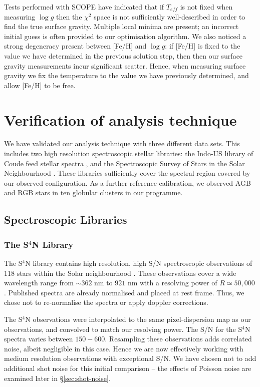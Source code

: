 \documentclass{emulateapj}
\begin{document}
Tests performed with SCOPE have indicated that if $T_{eff}$ is not fixed when measuring $\log{g}$ then the $\chi^2$ space is not sufficiently well-described in order to find the true surface gravity. Multiple local minima are present; an incorrect initial guess is often provided to our optimisation algorithm. We also noticed a strong degeneracy present between [Fe/H] and $\log{g}$: if [Fe/H] is fixed to the value we have determined in the previous solution step, then then our surface gravity measurements incur significant scatter. Hence, when measuring surface gravity we fix the temperature to the value we have previously determined, and allow [Fe/H] to be free.

\section{Verification of analysis technique}
\label{sec:calibration}

We have validated our analysis technique with three different data sets. This includes two high resolution spectroscopic stellar libraries: the Indo-US library of Coude feed stellar spectra \citep[][hereafter CFLIB]{Valdes;et-al_2004}, and the Spectroscopic Survey of Stars in the Solar Neighbourhood \citep[][hereafter S$^{4}$N]{Allende_Prieto;et-al_2004}. These libraries sufficiently cover the spectral region covered by our observed configuration. As a further reference calibration, we observed AGB and RGB stars in ten globular clusters in our programme.

\subsection{Spectroscopic Libraries}

\label{sec:S4N}
\subsubsection{The S$^4$N Library}
The S${^4}$N library contains high resolution, high S/N spectroscopic observations of 118 stars within the Solar neighbourhood \citep{Allende-Prieto;et-al_2004}. These observations cover a wide wavelength range from $\sim362$ nm to $921$ nm with a resolving power of $R\simeq50,000$. Published spectra are already normalised and placed at rest frame. Thus, we chose not to re-normalise the spectra or apply doppler corrections.

The S$^4$N observations were interpolated to the same pixel-dispersion map as our observations, and convolved to match our resolving power. The S/N for the S$^4$N spectra varies between $150-600$. Resampling these observations adds correlated noise, albeit negligible in this case. Hence we are now effectively working with medium resolution observations with exceptional S/N. We have chosen not to add additional shot noise for this initial comparison \--- the effects of Poisson noise are examined later in \S\ref{sec:shot-noise}.
\end{document}
